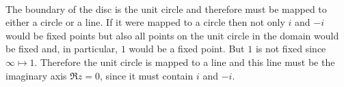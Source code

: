 \documentclass[12pt]{article}
\begin{document}
\begin{description}
  \\
  The boundary of the disc is the unit circle and therefore must be mapped to
  either a circle or a line. If it were mapped to a circle then not only $i$
  and $-i$ would be fixed points but also all points on the unit circle in the
  domain would be fixed and, in particular, $1$ would be a fixed point. But $1$
  is not fixed since $\infty \mapsto 1$. Therefore the unit circle is mapped to
  a line and this line must be the imaginary axis $\Re z = 0$, since it must
  contain $i$ and $-i$.


\end{description}
\end{document}
